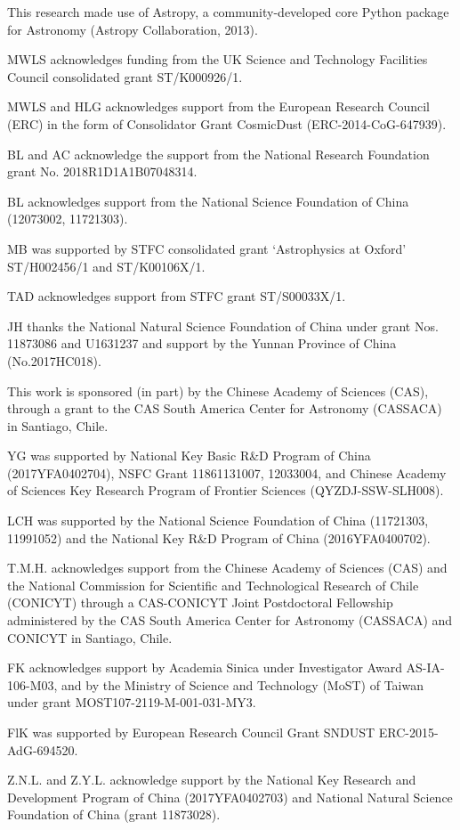 \documentclass[a4paper,fleqn,usenatbib, twocolumn]{aastex63}
\begin{document}
This research made use of Astropy, a community-developed core Python package for Astronomy (Astropy Collaboration, 2013).

MWLS acknowledges funding from the UK Science and Technology Facilities Council 
consolidated grant ST/K000926/1.

MWLS and HLG acknowledges support from the European Research Council (ERC) in the form of Consolidator Grant {\sc CosmicDust} (ERC-2014-CoG-647939). 

BL and AC acknowledge the support from the National Research Foundation grant No. 2018R1D1A1B07048314.

BL acknowledges support from the National Science Foundation of China (12073002, 11721303).

MB was supported by STFC consolidated grant `Astrophysics at Oxford' ST/H002456/1 and ST/K00106X/1.

TAD acknowledges support from STFC grant ST/S00033X/1.

JH thanks the National Natural Science Foundation of China under grant Nos. 11873086 and U1631237 and support by the Yunnan Province of China (No.2017HC018).

This work is sponsored (in part) by the Chinese Academy of Sciences (CAS), through a grant to the CAS South America Center for Astronomy (CASSACA) in Santiago, Chile.

YG was supported by National Key Basic R\&D Program of China (2017YFA0402704),  NSFC Grant 11861131007, 12033004, and Chinese Academy of Sciences Key Research Program of Frontier Sciences (QYZDJ-SSW-SLH008).

LCH was supported by the National Science Foundation of China (11721303, 11991052) and the National Key R\&D Program of China (2016YFA0400702).

T.M.H. acknowledges support from the Chinese Academy of Sciences (CAS) and the National Commission for Scientific and Technological Research of Chile (CONICYT) through a CAS-CONICYT Joint Postdoctoral Fellowship administered by the CAS South America Center for Astronomy (CASSACA) and CONICYT in Santiago, Chile.

FK acknowledges support by Academia Sinica under Investigator Award AS-IA-106-M03, and by the Ministry of Science and Technology (MoST) of Taiwan under grant MOST107-2119-M-001-031-MY3.

FlK was supported by European Research Council Grant SNDUST ERC-2015-AdG-694520.

Z.N.L. and Z.Y.L. acknowledge support by the National Key Research and Development Program of China (2017YFA0402703) and National Natural Science Foundation of China (grant 11873028).
\end{document}
